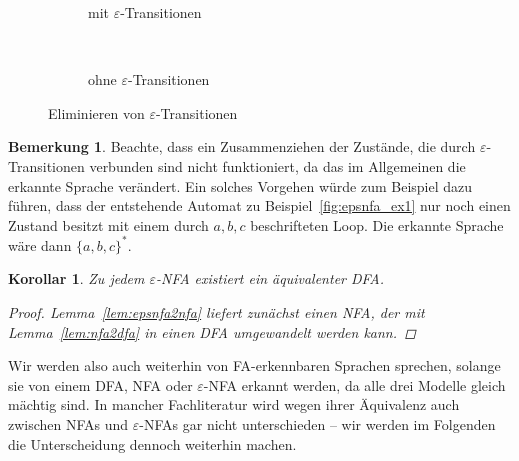 \documentclass[11pt, a4paper]{article}
\theoremstyle{definition}
\newtheorem*{remark*}{Bemerkung}
\theoremstyle{plain}
\newtheorem{corollary}[definition]{Korollar}
\numberwithin{equation}{section}
\begin{document}
\begin{figure}
	\centering
	\begin{subfigure}[b]{.49\textwidth}
		\centering
		
		\caption{mit \(\varepsilon\)-Transitionen}
		\label{fig:epsnfa_ex2_eps}
	\end{subfigure}~
	\begin{subfigure}[b]{.49\textwidth}
		\centering
		
		\caption{ohne \(\varepsilon\)-Transitionen}
		\label{fig:epsnfa_ex2_noeps}
	\end{subfigure}
	\caption{Eliminieren von \(\varepsilon\)-Transitionen}
	\label{fig:epsnfa_ex2}
\end{figure}
\begin{remark*}
	Beachte, dass ein Zusammenziehen der Zustände, die durch \(\varepsilon\)-Transitionen verbunden sind nicht funktioniert, da das im Allgemeinen die erkannte Sprache verändert. Ein solches Vorgehen würde zum Beispiel dazu führen, dass der entstehende Automat zu Beispiel~\ref{fig:epsnfa_ex1} nur noch einen Zustand besitzt mit einem durch \( a, b, c \) beschrifteten Loop. Die erkannte Sprache wäre dann \( \{a, b, c\}^\ast \).
\end{remark*}
\begin{corollary}
	Zu jedem \(\varepsilon\)-NFA existiert ein äquivalenter DFA.
	\begin{proof}
		Lemma~\ref{lem:epsnfa2nfa} liefert zunächst einen NFA, der mit Lemma~\ref{lem:nfa2dfa} in einen DFA umgewandelt werden kann.
	\end{proof}
\end{corollary}
Wir werden also auch weiterhin von FA-erkennbaren Sprachen sprechen, solange sie von einem DFA, NFA oder \(\varepsilon\)-NFA erkannt werden, da alle drei Modelle gleich mächtig sind. In mancher Fachliteratur wird wegen ihrer Äqui\-va\-lenz auch zwischen NFAs und \(\varepsilon\)-NFAs gar nicht unterschieden -- wir werden im Folgenden die Unterscheidung dennoch weiterhin machen.
\end{document}
